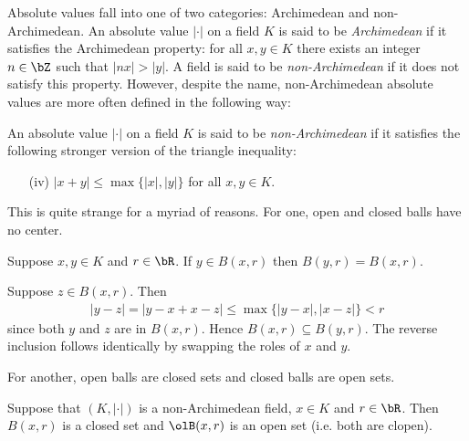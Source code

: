 Absolute values fall into one of two categories: Archimedean and non-Archimedean. An absolute value $|\cdot|$ on a field $K$ is said to be \emph{Archimedean} if it satisfies the Archimedean property: for all $x,y \in K$ there exists an integer $n \in \bZ$ such that $|nx| > |y|$. A field is said to be \emph{non-Archimedean} if it does not satisfy this property.  However, despite the name, non-Archimedean absolute values are more often defined in the following way:

\begin{defn}\label{defn:non-arch-abs-value}
	An absolute value $|\cdot|$ on a field $K$ is said to be \emph{non-Archimedean} if it satisfies the following stronger version of the triangle inequality:
	\begin{enumerate}[(i)]
		\item[(iv)] $|x + y| \leq \max\{|x|,|y|\}$ for all $x,y \in K$.
	\end{enumerate}
\end{defn}
This is quite strange for a myriad of reasons. For one, open and closed balls have no center.
\begin{prop}\label{prop:balls-no-center}
	Suppose $x,y \in K$ and $r \in \bR$. If $y \in B(x,r)$ then $B(y,r) = B(x,r)$.
\end{prop}
\begin{prf}
	Suppose $z \in B(x,r)$. Then
	\begin{align*}
		|y - z| = |y - x + x - z| \leq \max\{|y - x|,|x - z|\} < r
	\end{align*}
	since both $y$ and $z$ are in $B(x,r)$. Hence $B(x,r) \subseteq B(y,r)$. The reverse inclusion follows identically by swapping the roles of $x$ and $y$.
\end{prf}
For another, open balls are closed sets and closed balls are open sets.
\begin{prop}\label{prop:open-balls-are-closed}
	Suppose that $(K,|\cdot|)$ is a non-Archimedean field, $x \in K$ and $r \in \bR$. Then $B(x,r)$ is a closed set and $\olB(x,r)$ is an open set (i.e. both are clopen).
\end{prop}
